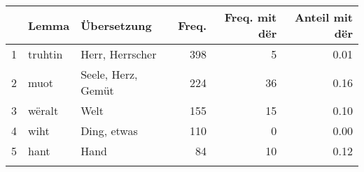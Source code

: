 \begin{tabular}{rllrrr}
  \lsptoprule
 & Lemma & Übersetzung & Freq. & Freq. mit dër & Anteil mit dër \\ 
  \midrule
1 & truhtin & Herr, Herrscher & 398 &   5 & 0.01 \\ 
  2 & muot & Seele, Herz, Gemüt & 224 &  36 & 0.16 \\ 
  3 & wëralt & Welt & 155 &  15 & 0.10 \\ 
  4 & wiht & Ding, etwas & 110 &   0 & 0.00 \\ 
  5 & hant & Hand &  84 &  10 & 0.12 \\ 
   \lspbottomrule
\end{tabular}

